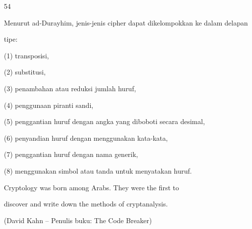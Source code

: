 \documentclass{article}
\begin{document}

54

Menurut ad-Durayhim, jenis-jenis cipher dapat dikelompokkan ke dalam delapan 

tipe:

(1) transposisi, 

(2) substitusi,

(3) penambahan atau reduksi jumlah huruf, 

(4) penggunaan piranti sandi,

(5) penggantian huruf dengan angka yang diboboti secara desimal, 

(6) penyandian huruf dengan menggunakan kata-kata, 

(7) penggantian huruf dengan nama generik, 

(8) menggunakan simbol atau tanda untuk menyatakan huruf.

Cryptology was born among Arabs. They were the first to 

discover and write down the methods of cryptanalysis.

(David Kahn – Penulis buku: The Code Breaker)
\end{document}

